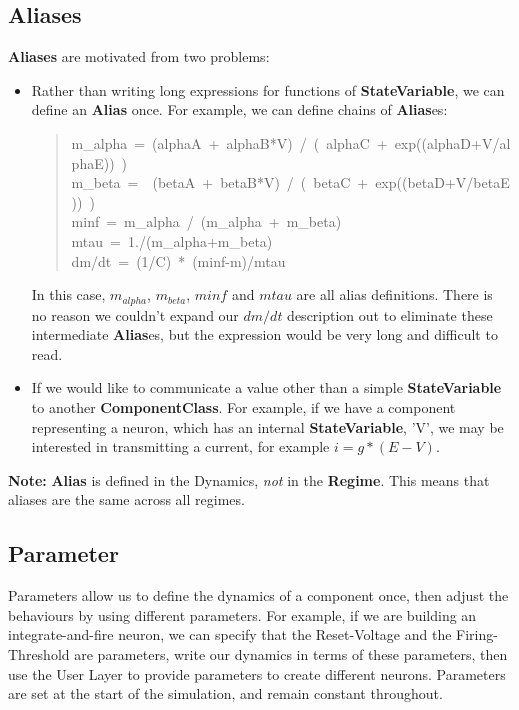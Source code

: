\documentclass{article}
\newcommand{\note}[1]{%
\begin{center}
\colorbox{issuecolor}{\parbox{0.8\linewidth}{\textbf{Note:} #1}}
\end{center}%
}
\newcommand{\ComponentClass}{{\bf{ComponentClass}}\xspace}
\newcommand{\StateVariable}{{\bf{StateVariable}}\xspace}
\newcommand{\Alias}{{\bf{Alias}}\xspace}
\newcommand{\Aliases}{{\bf{Alias}}es\xspace}
\newcommand{\Regime}{{\bf{Regime}}\xspace}
\begin{document}
\subsection{Aliases}
\label{alias}

\textbf{Aliases} are motivated from two problems:

\begin{itemize}
\item Rather than writing long expressions for functions of \StateVariable,
we can define an \Alias once. For example, we can define chains of
\Aliases:
%
\begin{quote}{\ttfamily \raggedright \noindent
m\_alpha~=~(alphaA~+~alphaB*V)~/~(~alphaC~+~exp((alphaD+V/alphaE))~)\\
m\_beta~=~~(betaA~+~betaB*V)~/~(~betaC~+~exp((betaD+V/betaE))~)\\
minf~=~m\_alpha~/~(m\_alpha~+~m\_beta)\\
mtau~=~1./(m\_alpha+m\_beta)\\
dm/dt~=~(1/C)~*~(minf-m)/mtau
}
\end{quote}

In this case, $m_{alpha}$, $m_{beta}$, $minf$ and $mtau$ are all
alias definitions. There is no reason we couldn't expand our $dm/dt$
description out to eliminate these intermediate \Aliases, but the expression
would be very long and difficult to read.

\item If we would like to communicate a value other than a simple \StateVariable
to another \ComponentClass. For example, if we have a component representing a
neuron, which has an internal \StateVariable, 'V', we may be interested in
transmitting a current, for example $i=g*(E-V)$.
\end{itemize}

\note{\Alias is defined in the Dynamics, \emph{not} in the
\Regime. This means that aliases are the same across all regimes.}

\subsection{Parameter}
\label{parameters}

Parameters allow us to define the dynamics of a component once, then
adjust the behaviours by using different parameters. For example, if
we are building an integrate-and-fire neuron, we can specify that the
Reset-Voltage and the Firing-Threshold are parameters, write our
dynamics in terms of these parameters, then use the User Layer to
provide parameters to create different neurons. Parameters are set at
the start of the simulation, and remain constant throughout.
\end{document}
